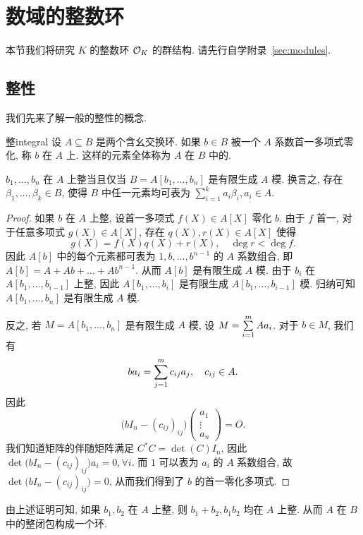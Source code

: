 \section{数域的整数环}
\label{ring of intergers}
本节我们将研究 $K$ 的整数环 ${\mathcal{O}}_K$ 的群结构. 请先行自学附录~\ref{sec:modules}.

\subsection{整性}
我们先来了解一般的整性的概念.
\begin{definition}{整}{integral}
设 $A\subseteq B$ 是两个含幺交换环. 如果 $b\in B$ 被一个 $A$ 系数首一多项式零化, 称 $b$ 在 $A$ 上. 这样的元素全体称为 $A$ 在 $B$ 中的.
\end{definition}

\begin{proposition}{}{}
$b_1,\dots,b_n$ 在 $A$ 上整当且仅当 $B=A[b_1,\dots,b_n]$ 是有限生成 $A$ 模.
换言之, 存在 $\beta_1,\dots,\beta_k\in B$, 使得 $B$ 中任一元素均可表为 $\sum_{i=1}^k a_i\beta_i,a_i\in A$.
\end{proposition}
\begin{proof}
如果 $b$ 在 $A$ 上整, 设首一多项式 $f(X)\in A[X]$ 零化 $b$. 由于 $f$ 首一, 对于任意多项式 $g(X)\in A[X]$, 存在 $q(X),r(X)\in A[X]$ 使得
  \[g(X)=f(X)q(X)+r(X),\quad \deg r< \deg f.\]
因此 $A[b]$ 中的每个元素都可表为 $1,b,\dots,b^{n-1}$ 的 $A$ 系数组合, 即 $A[b]=A+Ab+\dots+Ab^{n-1}$. 从而 $A[b]$ 是有限生成 $A$ 模. 由于 $b_i$ 在 $A[b_1,\dots,b_{i-1}]$ 上整, 因此 $A[b_1,\dots,b_i]$ 是有限生成 $A[b_1,\dots,b_{i-1}]$ 模. 归纳可知 $A[b_1,\dots,b_n]$ 是有限生成 $A$ 模.

反之, 若 $M=A[b_1,\dots,b_n]$ 是有限生成 $A$ 模, 设 $M=\sum\limits_{i=1}^m A a_i$. 对于 $b\in M$, 我们有
  \[b a_i=\sum\limits_{j=1}^m c_{ij} a_j,\quad c_{ij}\in A.\]
因此 
	\[\bigl(bI_n-(c_{ij})_{ij}\bigr)\begin{pmatrix}
		a_1\\ \vdots \\ a_n 
	\end{pmatrix}=O.\]
我们知道矩阵的伴随矩阵满足 $C^*C=\det(C)I_n$, 因此 $\det\bigl(bI_n-(c_{ij})_{ij}\bigr)a_i=0,\forall i$. 而 $1$ 可以表为 $a_i$ 的 $A$ 系数组合, 故 $\det\bigl(bI_n-(c_{ij})_{ij}\bigr)=0$, 从而我们得到了 $b$ 的首一零化多项式.
\end{proof}

由上述证明可知, 如果 $b_1,b_2$ 在 $A$ 上整, 则 $b_1+b_2,b_1b_2$ 均在 $A$ 上整. 从而 $A$ 在 $B$ 中的整闭包构成一个环.

